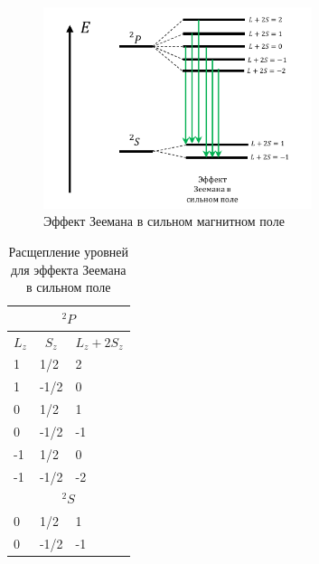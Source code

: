 \documentclass[12pt]{article}
\begin{document}
\begin{figure}[h!]
    \centering
    \includegraphics[width=0.7\textwidth,height=\textheight,keepaspectratio]{Seminar_08/pics/pic_04.pdf}
    \caption{Эффект Зеемана в сильном магнитном поле}
    \label{fig:sem_08_strong_zeeman}
\end{figure}


\begin{table}[h!]
\centering
\begin{tabular}{|l|l|l|}
\hline
\multicolumn{3}{|c|}{$^2P$}                                                                 \\ \hline
\multicolumn{1}{|c|}{$L_z$} & \multicolumn{1}{c|}{$S_z$} & \multicolumn{1}{c|}{$L_z+2S_z$} \\ \hline
1                          & 1/2                       & 2                               \\ \hline
1                          & -1/2                      & 0                               \\ \hline
0                          & 1/2                       & 1                               \\ \hline
0                          & -1/2                      & -1                              \\ \hline
-1                         & 1/2                       & 0                               \\ \hline
-1                         & -1/2                      & -2                              \\ \hline
\multicolumn{3}{|c|}{$^2S$}                                                                 \\ \hline
0                          & 1/2                       & 1                               \\ \hline
0                          & -1/2                      & -1                              \\ \hline
\end{tabular}
\caption{Расщепление уровней для эффекта Зеемана в сильном поле}
\end{table}
\end{document}
